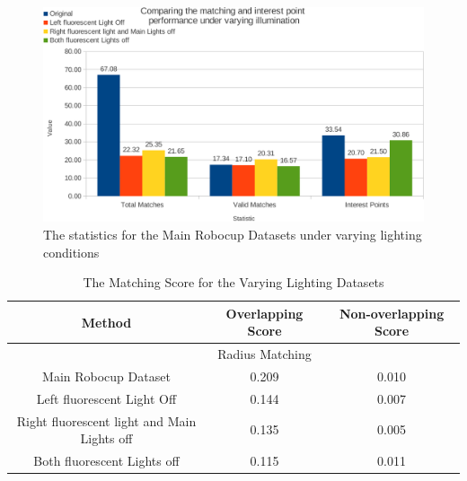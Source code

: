 \documentclass{report}
\begin{document}
\begin{figure}[h!] 
  \centering
    \includegraphics[width=1.0\textwidth]{../Drawings/Graphs/varyingLight_matches_keypoints.pdf}
    \caption{The statistics for the Main Robocup Datasets under varying lighting conditions}
    \label{fig:varyingLighting_matches_keypoints}
\end{figure}

\begin{table}
\caption{The Matching Score for the Varying Lighting Datasets}
\begin{tabular}{|c|c|c|}
\hline 
Method & Overlapping Score & Non-overlapping Score\tabularnewline
\hline 
\hline 
 & Radius Matching & \tabularnewline
\hline 
Main Robocup Dataset & 0.209 & 0.010\tabularnewline
\hline 
Left fluorescent Light Off & 0.144 & 0.007\tabularnewline
\hline 
Right fluorescent light and Main Lights off & 0.135 & 0.005\tabularnewline
\hline 
Both fluorescent Lights off & 0.115 & 0.011\tabularnewline
\hline 
\end{tabular}
\label{tab:lvMS}
\end{table}

\end{document}
